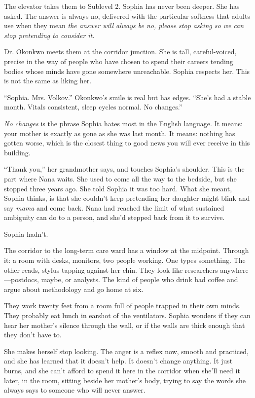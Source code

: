 The elevator takes them to Sublevel 2. Sophia has never been deeper. She has asked. The answer is always no, delivered with the particular softness that adults use when they mean \textit{the answer will always be no, please stop asking so we can stop pretending to consider it}.

Dr. Okonkwo meets them at the corridor junction. She is tall, careful-voiced, precise in the way of people who have chosen to spend their careers tending bodies whose minds have gone somewhere unreachable. Sophia respects her. This is not the same as liking her.

``Sophia. Mrs. Volkov.'' Okonkwo's smile is real but has edges. ``She's had a stable month. Vitals consistent, sleep cycles normal. No changes.''

\textit{No changes} is the phrase Sophia hates most in the English language. It means: your mother is exactly as gone as she was last month. It means: nothing has gotten worse, which is the closest thing to good news you will ever receive in this building.

``Thank you,'' her grandmother says, and touches Sophia's shoulder. This is the part where Nana waits. She used to come all the way to the bedside, but she stopped three years ago. She told Sophia it was too hard. What she meant, Sophia thinks, is that she couldn't keep pretending her daughter might blink and say \textit{mama} and come back. Nana had reached the limit of what sustained ambiguity can do to a person, and she'd stepped back from it to survive.

Sophia hadn't.

The corridor to the long-term care ward has a window at the midpoint. Through it: a room with desks, monitors, two people working. One types something. The other reads, stylus tapping against her chin. They look like researchers anywhere---postdocs, maybe, or analysts. The kind of people who drink bad coffee and argue about methodology and go home at six.

They work twenty feet from a room full of people trapped in their own minds. They probably eat lunch in earshot of the ventilators. Sophia wonders if they can hear her mother's silence through the wall, or if the walls are thick enough that they don't have to.

She makes herself stop looking. The anger is a reflex now, smooth and practiced, and she has learned that it doesn't help. It doesn't change anything. It just burns, and she can't afford to spend it here in the corridor when she'll need it later, in the room, sitting beside her mother's body, trying to say the words she always says to someone who will never answer.

